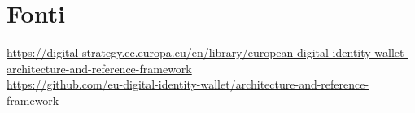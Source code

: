 \section{Fonti}
\href{https://digital-strategy.ec.europa.eu/en/library/european-digital-identity-wallet-architecture-and-reference-framework}{https://digital-strategy.ec.europa.eu/en/library/european-digital-identity-wallet-architecture-and-reference-framework}\\
\href{https://github.com/eu-digital-identity-wallet/architecture-and-reference-framework}{https://github.com/eu-digital-identity-wallet/architecture-and-reference-framework}